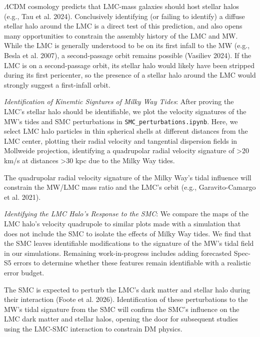 $\Lambda$CDM cosmology predicts that LMC-mass galaxies should host stellar halos (e.g., Tau et al. 2024). Conclusively identifying (or failing to identify) a diffuse stellar halo around the LMC is a direct test of this prediction, and also opens many opportunities to constrain the assembly history of the LMC and MW. While the LMC is generally understood to be on its first infall to the MW (e.g., Besla et al. 2007), a second-passage orbit remains possible (Vasiliev 2024). If the LMC is on a second-passage orbit, its stellar halo would likely have been stripped during its first pericenter, so the presence of a stellar halo around the LMC would strongly suggest a first-infall orbit.

\textit{Identification of Kinemtic Signtures of Milky Way Tides}: After proving the LMC's stellar halo should be identifiable, we plot the velocity signatures of the MW's tides and SMC perturbations in \texttt{SMC_perturbations.ipynb}. Here, we select LMC halo particles in thin spherical shells at different distances from the LMC center, plotting their radial velocity and tangential dispersion fields in Mollweide projection, identifying a quadrupolar radial velocity signature of >20 km/s at distances >30 kpc due to the Milky Way tides.

The quadrupolar radial velocity signature of the Milky Way's tidal influence will constrain the MW/LMC mass ratio and the LMC's orbit (e.g., Garavito-Camargo et al. 2021).  

\textit{Identifying the LMC Halo's Response to the SMC}: We compare the maps of the LMC halo's velocity quadrupole to similar plots made with a simulation that does not include the SMC to isolate the effects of Milky Way tides. We find that the SMC leaves identifiable modifications to the signature of the MW's tidal field in our simulations. Remaining work-in-progress includes adding forecasted Spec-S5 errors to determine whether these features remain identifiable with a realistic error budget. 

The SMC is expected to perturb the LMC's dark matter and stellar halo during their interaction (Foote et al. 2026). Identification of these perturbations to the MW's tidal signature from the SMC will confirm the SMC's influence on the LMC dark matter and stellar halos, opening the door for subsequent studies using the LMC-SMC interaction to constrain DM physics. 